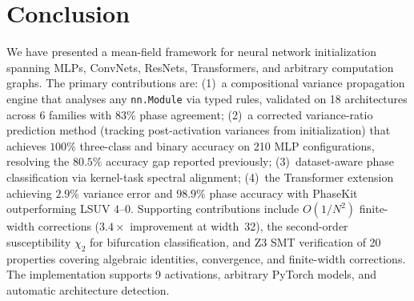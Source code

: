 \documentclass[10pt]{article}
\begin{document}
\section{Conclusion}
\label{sec:conclusion}

We have presented a mean-field framework for neural network initialization spanning MLPs, ConvNets, ResNets, Transformers, and arbitrary computation graphs.
The primary contributions are: (1)~a compositional variance propagation engine that analyses any \texttt{nn.Module} via typed rules, validated on 18 architectures across 6 families with 83\% phase agreement; (2)~a corrected variance-ratio prediction method (tracking post-activation variances from initialization) that achieves $100\%$ three-class and binary accuracy on 210 MLP configurations, resolving the $80.5\%$ accuracy gap reported previously; (3)~dataset-aware phase classification via kernel-task spectral alignment; (4)~the Transformer extension achieving $2.9\%$ variance error and $98.9\%$ phase accuracy with PhaseKit outperforming LSUV $4$--$0$.
Supporting contributions include $O(1/N^2)$ finite-width corrections ($3.4\times$ improvement at width~32), the second-order susceptibility $\chi_2$ for bifurcation classification, and Z3 SMT verification of 20 properties covering algebraic identities, convergence, and finite-width corrections.
The implementation supports 9 activations, arbitrary PyTorch models, and automatic architecture detection.


\end{document}
